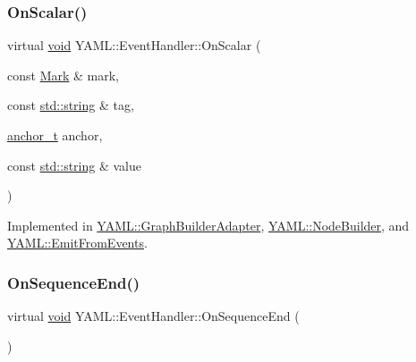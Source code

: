 \subsubsection{\texorpdfstring{OnScalar()}{OnScalar()}}
{\footnotesize\ttfamily virtual \mbox{\hyperlink{glad_8h_a950fc91edb4504f62f1c577bf4727c29}{void}} Y\+A\+M\+L\+::\+Event\+Handler\+::\+On\+Scalar (\begin{DoxyParamCaption}\item[{const \mbox{\hyperlink{struct_y_a_m_l_1_1_mark}{Mark}} \&}]{mark,  }\item[{const \mbox{\hyperlink{glad_8h_ac83513893df92266f79a515488701770}{std\+::string}} \&}]{tag,  }\item[{\mbox{\hyperlink{namespace_y_a_m_l_abeff1798814ae3402fc5665fdcad1de6}{anchor\+\_\+t}}}]{anchor,  }\item[{const \mbox{\hyperlink{glad_8h_ac83513893df92266f79a515488701770}{std\+::string}} \&}]{value }\end{DoxyParamCaption})\hspace{0.3cm}{\ttfamily [pure virtual]}}



Implemented in \mbox{\hyperlink{class_y_a_m_l_1_1_graph_builder_adapter_a74fffb942e64a1b6576368a49089c5a4}{Y\+A\+M\+L\+::\+Graph\+Builder\+Adapter}}, \mbox{\hyperlink{class_y_a_m_l_1_1_node_builder_a433706a6b7ef7fbca180af1e4b83f2b9}{Y\+A\+M\+L\+::\+Node\+Builder}}, and \mbox{\hyperlink{class_y_a_m_l_1_1_emit_from_events_a9199c18b9ff840043d74400a8a302752}{Y\+A\+M\+L\+::\+Emit\+From\+Events}}.

\mbox{\label{class_y_a_m_l_1_1_event_handler_a8b36cc36cd7067175b80b5d047aafaf3}} 
\subsubsection{\texorpdfstring{OnSequenceEnd()}{OnSequenceEnd()}}
{\footnotesize\ttfamily virtual \mbox{\hyperlink{glad_8h_a950fc91edb4504f62f1c577bf4727c29}{void}} Y\+A\+M\+L\+::\+Event\+Handler\+::\+On\+Sequence\+End (\begin{DoxyParamCaption}{ }\end{DoxyParamCaption})\hspace{0.3cm}{\ttfamily [pure virtual]}}



